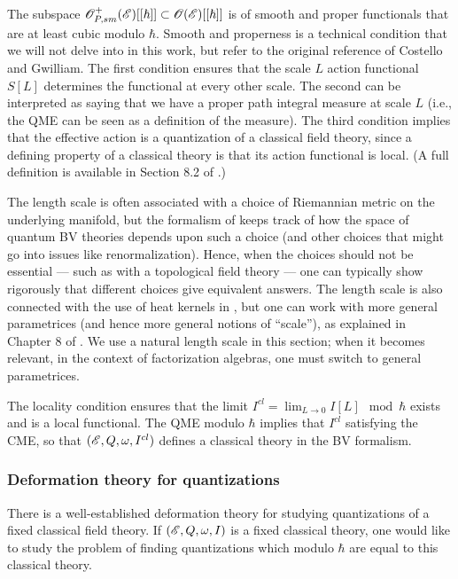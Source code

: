 \documentclass[10pt]{amsart}
\begin{document}
The subspace $\mathscr O_{P,sm}^+(\mathscr E)[[\hbar]] \subset \mathscr O(\mathscr E)[[\hbar]]$ is of smooth and proper functionals that are at least cubic modulo $\hbar$. 
Smooth and properness is a technical condition that we will not delve into in this work, but refer to the original reference of Costello and Gwilliam.
The first condition ensures that the scale $L$ action functional $S[L]$ determines the functional at every other scale.
The second can be interpreted as saying that we have a proper path integral measure at scale $L$ 
(i.e., the QME can be seen as a definition of the measure).
The third condition implies that the effective action is a quantization of a classical field theory,
since a defining property of a classical theory is that its action functional is local.
(A full definition is available in Section 8.2 of \cite{CG2}.)

\begin{rmk}
The length scale is often associated with a choice of Riemannian metric on the underlying manifold,
but the formalism of \cite{CostelloRenormalization} keeps track of how the space of quantum BV theories depends upon such a choice 
(and other choices that might go into issues like renormalization).
Hence, when the choices should not be essential --- such as with a topological field theory --- one can typically show rigorously that different choices give equivalent answers.
The length scale is also connected with the use of heat kernels in \cite{CostelloRenormalization},
but one can work with more general parametrices (and hence more general notions of ``scale''),
as explained in Chapter 8 of \cite{CG2}.
We use a natural length scale in this section; 
when it becomes relevant, in the context of factorization algebras, one must switch to general parametrices.
\end{rmk}

The locality condition ensures that the limit $I^{cl} = \lim_{L \to 0} I[L] \mod \hbar$ exists and is a local functional.
The QME modulo $\hbar$ implies that $I^{cl}$ satisfying the CME, so that $(\mathscr E, Q, \omega, I^{cl})$ defines a classical theory in the BV formalism.

\subsubsection{Deformation theory for quantizations}

There is a well-established deformation theory for studying quantizations of a fixed classical field theory.
If $(\mathscr E, Q, \omega, I)$ is a fixed classical theory, one would like to study the problem of finding quantizations which modulo $\hbar$ are equal to this classical theory. 
\end{document}
